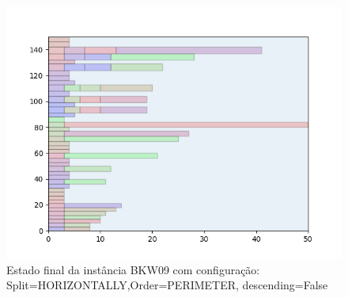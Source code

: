 \begin{figure}[H]
    \centering
    \caption[]{Estado final da instância BKW09 com configuração: Split=HORIZONTALLY,Order=PERIMETER, descending=False}
    \label{fig:bkw09-horizontally-perimeter-false}
    \includegraphics[scale=0.5]{output/figures/bkw/bkw09/horizontally/perimeter/false/000}
\end{figure}